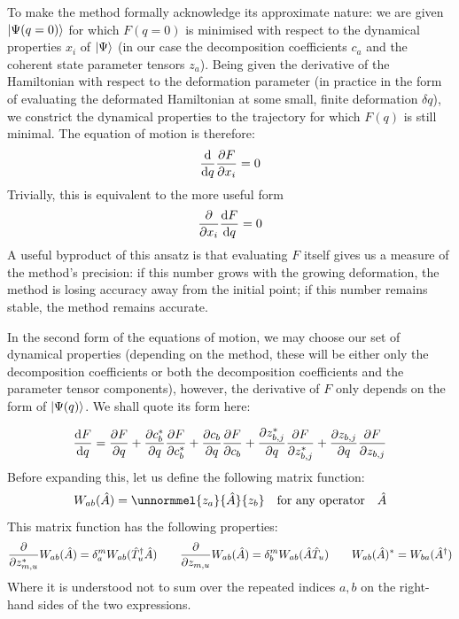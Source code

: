 \documentclass[12pt]{article}
\newcommand{\hc}{^\dagger}
\begin{document}
	To make the method formally acknowledge its approximate nature: we are given $\ket{\Psi(q = 0)}$ for which $F(q = 0)$ is minimised with respect to the dynamical properties $x_i$ of $\ket{\Psi}$ (in our case the decomposition coefficients $c_a$ and the coherent state parameter tensors $z_a$). Being given the derivative of the Hamiltonian with respect to the deformation parameter (in practice in the form of evaluating the deformated Hamiltonian at some small, finite deformation $\delta q$), we constrict the dynamical properties to the trajectory for which $F(q)$ is still minimal. The equation of motion is therefore:
	\begin{align}
	\dv{q} \pdv{F}{x_i} = 0
	\end{align}
	Trivially, this is equivalent to the more useful form
	\begin{equation}
	\pdv{x_i} \dv{F}{q} = 0
	\end{equation}
	A useful byproduct of this ansatz is that evaluating $F$ itself gives us a measure of the method's precision: if this number grows with the growing deformation, the method is losing accuracy away from the initial point; if this number remains stable, the method remains accurate.
	
	In the second form of the equations of motion, we may choose our set of dynamical properties (depending on the method, these will be either only the decomposition coefficients or both the decomposition coefficients and the parameter tensor components), however, the derivative of $F$ only depends on the form of $\ket{\Psi(q)}$. We shall quote its form here:
	
	\begin{equation}
	\dv{F}{q} = \pdv{F}{q} + \pdv{c_b^*}{q} \pdv{F}{c_b^*} + \pdv{c_b}{q} \pdv{F}{c_b} + \pdv{z_{b,j}^*}{q} \pdv{F}{z_{b,j}^*} + \pdv{z_{b,j}}{q} \pdv{F}{z_{b,j}}
	\end{equation}
	Before expanding this, let us define the following matrix function:
	\begin{equation}
	W_{ab}(\hat{A}) = \unnormmel{z_a}{\hat{A}}{z_b}\qq{for any operator} \hat{A}
	\end{equation}
	This matrix function has the following properties:
	\begin{equation}
	\pdv{z_{m,u}^*} W_{ab}(\hat{A}) = \delta_a^m W_{ab}(\hat{T}_u\hc\hat{A}) \qquad \pdv{z_{m,u}} W_{ab}(\hat{A}) = \delta_b^m W_{ab}(\hat{A}\hat{T}_u) \qquad W_{ab}(\hat{A})^* = W_{ba}(\hat{A}\hc)
	\end{equation}
	Where it is understood not to sum over the repeated indices $a,b$ on the right-hand sides of the two expressions.
	
\end{document}
